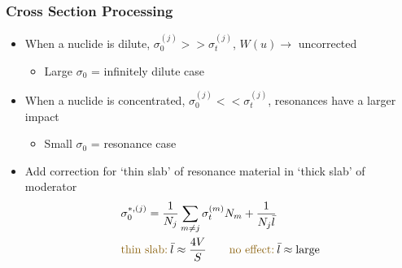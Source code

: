 \documentclass[xcolor=x11names,compress]{beamer}
\renewcommand{\(}{\begin{columns}}
\renewcommand{\)}{\end{columns}}
\newcommand{\<}[1]{\begin{column}{#1}}
\renewcommand{\>}{\end{column}}
\begin{document}
\begin{frame}[fragile]
  \frametitle{Cross Section Processing}

	\begin{itemize}
	\item When a nuclide is dilute, $\sigma_0^{(j)} >>
	 \sigma_t^{(j)}$, $W(u) \rightarrow$ uncorrected 
		\begin{itemize}
		\item Large $\sigma_0$ = infinitely dilute case	
		\end{itemize}

	\item When a nuclide is concentrated, $\sigma_0^{(j)} << 
	 \sigma_t^{(j)}$, resonances have a larger impact 
		\begin{itemize}
		\item Small $\sigma_0$ = resonance case	
		\end{itemize}
	\end{itemize}

    \pause	
	\begin{itemize}
	\item Add correction for `thin slab' of resonance material in 
	`thick slab' of moderator
	\begin{align}
  	&\sigma_0^{*,(j)} = \frac{1}{N_j} \sum_{m \ne j} \sigma_{t}^{(m)} N_m 
	+ \frac{1}{N_j \bar{l}} \\
  	&\text{\textcolor{byellow}{thin slab:}}\:\bar{l} \approx \frac{4V}{S} \qquad \text{\textcolor{byellow}{no effect:}}\:\bar{l} \approx \text{large} \nonumber
	\end{align}
	\end{itemize}
  
\end{frame}
\end{document}
